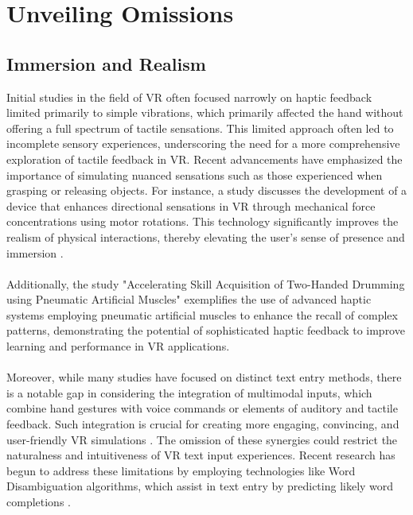 \section{Unveiling Omissions}
\label{sec: Unveiling Omissions}

\subsection{Immersion and Realism} 
\label{sec: Immersion and Realism}
Initial studies in the field of \ac{VR} often focused narrowly on haptic feedback limited primarily to simple vibrations, which primarily affected the hand without offering a full spectrum of tactile sensations. This limited approach often led to incomplete sensory experiences, underscoring the need for a more comprehensive exploration of tactile feedback in \ac{VR}. Recent advancements have emphasized the importance of simulating nuanced sensations such as those experienced when grasping or releasing objects. For instance, a study \cite{directionalForce2019} discusses the development of a device that enhances directional sensations in \ac{VR} through mechanical force concentrations using motor rotations. This technology significantly improves the realism of physical interactions, thereby elevating the user's sense of presence and immersion \cite{mcneill2009gesture, stanney2019handbook}.\\ \\
Additionally, the study "Accelerating Skill Acquisition of Two-Handed Drumming using Pneumatic Artificial Muscles" \cite{dasPneumatic} exemplifies the use of advanced haptic systems employing pneumatic artificial muscles to enhance the recall of complex patterns, demonstrating the potential of sophisticated haptic feedback to improve learning and performance in \ac{VR} applications.\\ \\
Moreover, while many studies have focused on distinct text entry methods, there is a notable gap in considering the integration of multimodal inputs, which combine hand gestures with voice commands or elements of auditory and tactile feedback. Such integration is crucial for creating more engaging, convincing, and user-friendly \ac{VR} simulations \cite{wickens2015engineering}. The omission of these synergies could restrict the naturalness and intuitiveness of \ac{VR} text input experiences. Recent research has begun to address these limitations by employing technologies like Word Disambiguation algorithms, which assist in text entry by predicting likely word completions \cite{baljko2006automatic}.\\ \\
